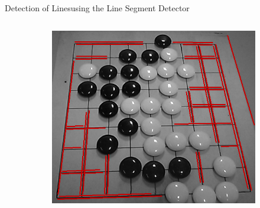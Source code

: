 \documentclass[table]{beamer}
\begin{document}
\begin{frame}{Detection of Lines}{using the Line Segment Detector}
\begin{columns}
\begin{column}{0.5\textwidth}
\begin{figure}
\begin{center}
\begin{subfigure}{}
					\end{subfigure}
					\begin{subfigure}{}
						\includegraphics[width=0.45\columnwidth]{images/lsd_final.png}
					\end{subfigure}
				\end{center}
			\end{figure}
		\end{column}
	\end{columns}
\end{frame}
\end{document}
